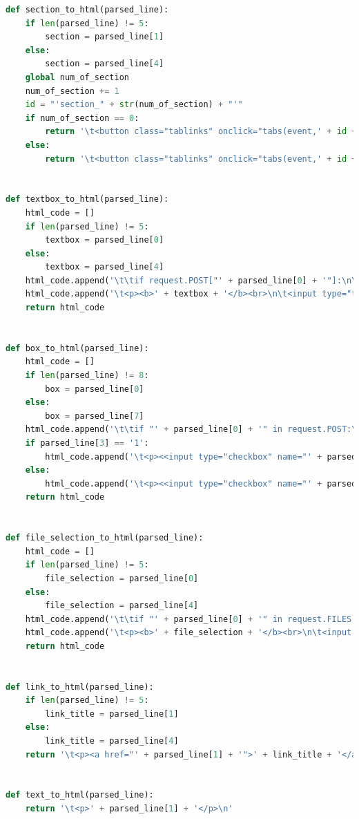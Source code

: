 \begin{lstlisting}[frame=single, label={rndhpcgui.2023.05.04.generation}, caption={Функции создания HTML-кода}, language={Python}] 
    def section_to_html(parsed_line):
    if len(parsed_line) != 5:
        section = parsed_line[1]
    else:
        section = parsed_line[4]
    global num_of_section
    num_of_section += 1
    id = "'section_" + str(num_of_section) + "'"
    if num_of_section == 0:
        return '\t<button class="tablinks" onclick="tabs(event,' + id + ')" id="defaultOpen">' + section + '</button>\n'
    else:
        return '\t<button class="tablinks" onclick="tabs(event,' + id + ')">' + section + '</button>\n'


def textbox_to_html(parsed_line):
    html_code = []
    if len(parsed_line) != 5:
        textbox = parsed_line[0]
    else:
        textbox = parsed_line[4]
    html_code.append('\t\tif request.POST["' + parsed_line[0] + '"]:\n\t\t\t' + parsed_line[0] + ' = request.POST["' + parsed_line[0] + '"]\n')
    html_code.append('\t<p><b>' + textbox + '</b><br>\n\t<input type="text" name="' + parsed_line[0] + '" value="' + parsed_line[2] + '"></p>\n')
    return html_code


def box_to_html(parsed_line):
    html_code = []
    if len(parsed_line) != 8:
        box = parsed_line[0]
    else:
        box = parsed_line[7]
    html_code.append('\t\tif "' + parsed_line[0] + '" in request.POST:\n\t\t\t' + parsed_line[0] + ' = request.POST["' + parsed_line[0] + '"]\n')
    if parsed_line[3] == '1':
        html_code.append('\t<p><<input type="checkbox" name="' + parsed_line[0] + '" value="' + parsed_line[0] + '" checked>' + box + '</p>\n')
    else:
        html_code.append('\t<p><<input type="checkbox" name="' + parsed_line[0] + '" value="' + parsed_line[0] + '">' + box + '</p>\n')
    return html_code


def file_selection_to_html(parsed_line):
    html_code = []
    if len(parsed_line) != 5:
        file_selection = parsed_line[0]
    else:
        file_selection = parsed_line[4]
    html_code.append('\t\tif "' + parsed_line[0] + '" in request.FILES:\n\t\t\t' + parsed_line[0] + ' = request.FILES["' + parsed_line[0] + '"]\n\t\t\tfs = FileSystemStorage()\n\t\t\tfilename = fs.save(' + parsed_line[0] + '.name, ' + parsed_line[0] + ')\n\t\t\timage_url = fs.url(filename)\n')
    html_code.append('\t<p><b>' + file_selection + '</b><br>\n\t<input type="file" name="' + parsed_line[0] + '"></p>\n')
    return html_code


def link_to_html(parsed_line):
    if len(parsed_line) != 5:
        link_title = parsed_line[1]
    else:
        link_title = parsed_line[4]
    return '\t<p><a href="' + parsed_line[1] + '">' + link_title + '</a></p>\n'


def text_to_html(parsed_line):
    return '\t<p>' + parsed_line[1] + '</p>\n'

\end{lstlisting}


